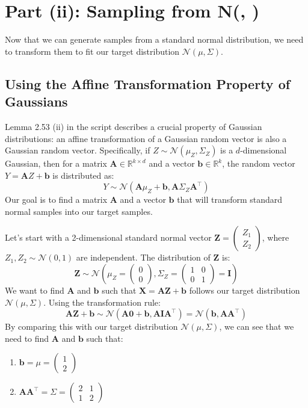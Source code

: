 \documentclass[11pt,a4paper]{article}
\newcommand{\R}{\mathbb{R}}
\newcommand{\N}{\mathcal{N}}
\newcommand{\mat}[1]{\mathbf{#1}}
\newcommand{\T}{\top}
\begin{document}
\section{Part (ii): Sampling from N(\textmu, \Sigma)}

Now that we can generate samples from a standard normal distribution, we need to transform them to fit our target distribution $\N(\mu, \Sigma)$.

\subsection{Using the Affine Transformation Property of Gaussians}
Lemma 2.53 (ii) in the script describes a crucial property of Gaussian distributions: an affine transformation of a Gaussian random vector is also a Gaussian random vector. Specifically, if $Z \sim \N(\mu_Z, \Sigma_Z)$ is a $d$-dimensional Gaussian, then for a matrix $\mat{A} \in \R^{k \times d}$ and a vector $\mat{b} \in \R^k$, the random vector $Y = \mat{A}Z + \mat{b}$ is distributed as:
\[ Y \sim \N(\mat{A}\mu_Z + \mat{b}, \mat{A}\Sigma_Z \mat{A}^\T) \]
Our goal is to find a matrix $\mat{A}$ and a vector $\mat{b}$ that will transform standard normal samples into our target samples.

Let's start with a 2-dimensional standard normal vector $\mat{Z} = \begin{pmatrix} Z_1 \\ Z_2 \end{pmatrix}$, where $Z_1, Z_2 \sim \N(0,1)$ are independent. The distribution of $\mat{Z}$ is:
\[ \mat{Z} \sim \N\left(\mu_Z = \begin{pmatrix} 0 \\ 0 \end{pmatrix}, \Sigma_Z = \begin{pmatrix} 1 & 0 \\ 0 & 1 \end{pmatrix} = \mat{I}\right) \]
We want to find $\mat{A}$ and $\mat{b}$ such that $\mat{X} = \mat{A}\mat{Z} + \mat{b}$ follows our target distribution $\N(\mu, \Sigma)$. Using the transformation rule:
\[ \mat{A}\mat{Z} + \mat{b} \sim \N(\mat{A}\mathbf{0} + \mat{b}, \mat{A}\mat{I}\mat{A}^\T) = \N(\mat{b}, \mat{A}\mat{A}^\T) \]
By comparing this with our target distribution $\N(\mu, \Sigma)$, we can see that we need to find $\mat{A}$ and $\mat{b}$ such that:
\begin{enumerate}
    \item $\mat{b} = \mu = \begin{pmatrix} 1 \\ 2 \end{pmatrix}$
    \item $\mat{A}\mat{A}^\T = \Sigma = \begin{pmatrix} 2 & 1 \\ 1 & 2 \end{pmatrix}$
\end{enumerate}
\end{document}
